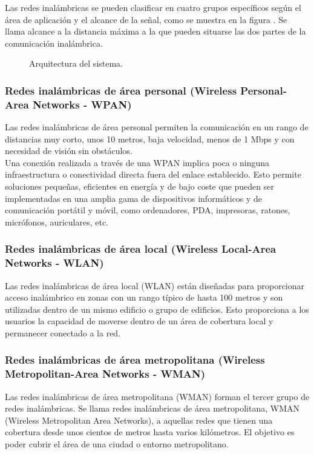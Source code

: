 	Las redes inalámbricas se pueden clasificar en cuatro grupos específicos según el área de aplicación y el alcance de la señal, como se muestra en la figura . Se llama alcance a la distancia máxima a la que pueden situarse las dos partes de la comunicación inalámbrica.
	
	\begin{figure}[htbp!]
		\centering
		\caption{Arquitectura del sistema.}
		\label{fig:tiposRedes}
	\end{figure}
	
	
	\subsubsection{\textbf{Redes inalámbricas de área personal (Wireless Personal-Area Networks - WPAN)}}
	Las redes inalámbricas de área personal permiten la comunicación en un rango de distancias muy corto, unos 10 metros, baja velocidad, menos de 1 Mbps y con necesidad de visión sin obstáculos.\\
	
	Una conexión realizada a través de una WPAN implica poca o ninguna infraestructura o conectividad directa fuera del enlace establecido. Esto permite soluciones pequeñas, eficientes en energía y de bajo coste que pueden ser implementadas en una amplia gama de dispositivos informáticos y de comunicación portátil y móvil, como ordenadores, PDA, impresoras, ratones, micrófonos, auriculares, etc.
	
	\subsubsection{\textbf{Redes inalámbricas de área local (Wireless Local-Area Networks - WLAN)}}
	Las redes inalámbricas de área local (WLAN) están diseñadas para proporcionar acceso inalámbrico en zonas con un rango típico de hasta 100 metros y son utilizadas dentro de un mismo edificio o grupo de edificios. Esto proporciona a los usuarios la capacidad de moverse dentro de un área de cobertura local y permanecer conectado a la red. 
	
	\subsubsection{\textbf{Redes inalámbricas de área metropolitana (Wireless Metropolitan-Area Networks - WMAN)}}
	Las redes inalámbricas de área metropolitana (WMAN) forman el tercer grupo de redes inalámbricas. Se llama redes inalámbricas de área metropolitana, WMAN (Wireless Metropolitan Area Networks), a aquellas redes que tienen una cobertura desde unos cientos de metros hasta varios kilómetros. El objetivo es poder cubrir el área de una ciudad o entorno metropolitano. 
	

